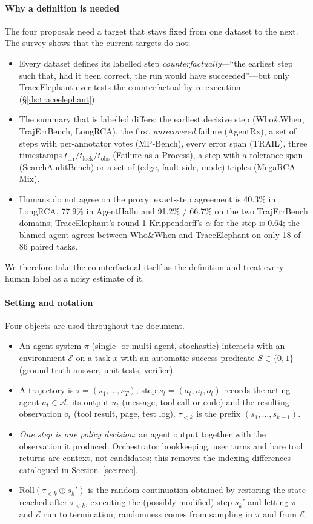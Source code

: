 \documentclass[10pt,a4paper]{article}
\begin{document}
\paragraph{Why a definition is needed} The four proposals need a target that stays fixed from one dataset to the next. The survey shows that the current targets do not:
\begin{itemize}[leftmargin=1.1em]
\item Every dataset defines its labelled step \emph{counterfactually}---``the earliest step such that, had it been correct, the run would have succeeded''---but only TraceElephant ever tests the counterfactual by re-execution (\S\ref{ds:traceelephant}).
\item The summary that is labelled differs: the earliest decisive step (Who\&When, TrajErrBench, LongRCA), the first \emph{unrecovered} failure (AgentRx), a set of steps with per-annotator votes (MP-Bench), every error span (TRAIL), three timestamps $t_{\mathrm{err}}/t_{\mathrm{lock}}/t_{\mathrm{obs}}$ (Failure-as-a-Process), a step with a tolerance span (SearchAuditBench) or a set of (edge, fault side, mode) triples (MegaRCA-Mix).
\item Humans do not agree on the proxy: exact-step agreement is 40.3\% in LongRCA, 77.9\% in AgentHallu and 91.2\% / 66.7\% on the two TrajErrBench domains; TraceElephant's round-1 Krippendorff's $\alpha$ for the step is 0.64; the blamed agent agrees between Who\&When and TraceElephant on only 18 of 86 paired tasks.
\end{itemize}
We therefore take the counterfactual itself as the definition and treat every human label as a noisy estimate of it.

\paragraph{Setting and notation} Four objects are used throughout the document.
\begin{itemize}[leftmargin=1.1em]
\item An agent system $\pi$ (single- or multi-agent, stochastic) interacts with an environment $\mathcal{E}$ on a task $x$ with an automatic success predicate $S\in\{0,1\}$ (ground-truth answer, unit tests, verifier).
\item A trajectory is $\tau=(s_1,\dots,s_T)$; step $s_t=(a_t,u_t,o_t)$ records the acting agent $a_t\in\mathcal{A}$, its output $u_t$ (message, tool call or code) and the resulting observation $o_t$ (tool result, page, test log). $\tau_{<k}$ is the prefix $(s_1,\dots,s_{k-1})$.
\item \emph{One step is one policy decision}: an agent output together with the observation it produced. Orchestrator bookkeeping, user turns and bare tool returns are context, not candidates; this removes the indexing differences catalogued in Section~\ref{sec:reco}.
\item $\mathrm{Roll}(\tau_{<k}\oplus s_k')$ is the random continuation obtained by restoring the state reached after $\tau_{<k}$, executing the (possibly modified) step $s_k'$ and letting $\pi$ and $\mathcal{E}$ run to termination; randomness comes from sampling in $\pi$ and from $\mathcal{E}$.
\end{itemize}
\end{document}
